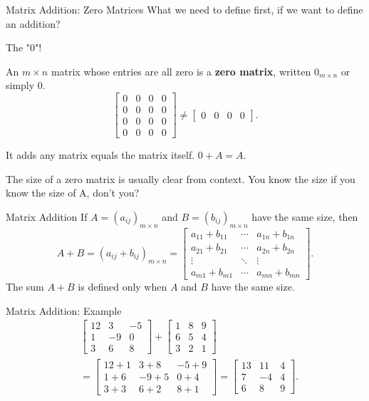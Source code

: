 \begin{frame}{Matrix Addition: Zero Matrices}
What we need to define first, if we want to define an addition?\pause

The "0"!\pause

An $m\times n$ matrix whose entries are all zero is a \textbf{zero matrix}, written $0_{m\times n}$ or simply $0$.
\[
\begin{bmatrix}
0&0&0&0\\
0&0&0&0\\
0&0&0&0\\
0&0&0&0
\end{bmatrix}
\ne
\begin{bmatrix}0&0&0&0\end{bmatrix}.
\]

It adds any matrix equals the matrix itself. $0+A=A$.\pause

The size of a zero matrix is usually clear from context. You know the size if you know the size of A, don't you?
\end{frame}


\begin{frame}{Matrix Addition}
If $A=(a_{ij})_{m\times n}$ and $B=(b_{ij})_{m\times n}$ have the same size, then
\[
A+B=(a_{ij}+b_{ij})_{m\times n}
=\begin{bmatrix}
a_{11}+b_{11}&\cdots&a_{1n}+b_{1n}\\
a_{21}+b_{21}&\cdots&a_{2n}+b_{2n}\\
\vdots&\ddots&\vdots\\
a_{m1}+b_{m1}&\cdots&a_{mn}+b_{mn}
\end{bmatrix}.
\]
\alert{The sum $A+B$ is defined only when $A$ and $B$ have the same size.}
\end{frame}

\begin{frame}{Matrix Addition: Example}
\small
\begin{align*}
&\begin{bmatrix}12&3&-5\\1&-9&0\\3&6&8\end{bmatrix}
+\begin{bmatrix}1&8&9\\6&5&4\\3&2&1\end{bmatrix}\\[1ex]
&=\begin{bmatrix}12+1&3+8&-5+9\\1+6&-9+5&0+4\\3+3&6+2&8+1\end{bmatrix}
=\begin{bmatrix}13&11&4\\7&-4&4\\6&8&9\end{bmatrix}.
\end{align*}
\end{frame}

